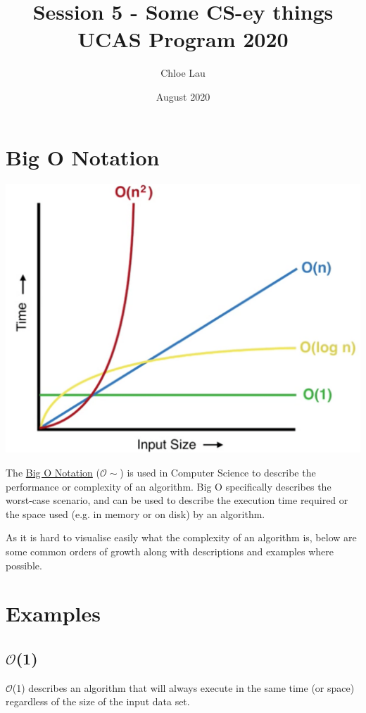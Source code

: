 \documentclass[12pt]{article}
\title{\vspace{-2cm} \textbf{Session 5 - Some CS-ey things} \\ UCAS Program 2020}
\author{Chloe Lau}
\date{August 2020}
\begin{document}
\setlength{\parindent}{4ex}
\setlength{\parskip}{1em}

\maketitle

\section{Big O Notation}
\begin{center}
    \includegraphics[scale=0.2]{bigo.png}
\end{center}

The \href{https://en.wikipedia.org/wiki/Big_O_notation}{Big O Notation} ($\mathcal{O} \sim$) is used in Computer Science to describe the performance or complexity of an algorithm. Big O specifically describes the worst-case scenario, and can be used to describe the execution time required or the space used (e.g. in memory or on disk) by an algorithm.

As it is hard to visualise easily what the complexity of an algorithm is, below are some common orders of growth along with descriptions and examples where possible.

\section{Examples}

\subsection{$\mathcal{O}$(1)}
$\mathcal{O}$(1) describes an algorithm that will always execute in the same time (or space) regardless of the size of the input data set.
\end{document}
